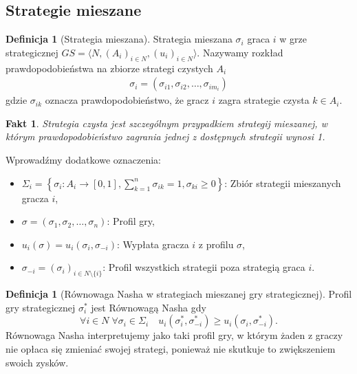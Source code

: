 \documentclass[inzynierska]{pwr_wmat_praca_dyplomowa}
\theoremstyle{plain}
\numberwithin{theorem}{chapter}
\newtheorem{fact}[theorem]{Fakt}
\theoremstyle{definition}
\numberwithin{theorem}{chapter}
\newtheorem{definition}[theorem]{Definicja}
\begin{document}
	\subsection{Strategie mieszane}
	\begin{definition}[Strategia mieszana]
		Strategia mieszana $\sigma_i$ graca $i$ w grze strategicznej $GS = \langle N, (A_i)_{i \in N}, (u_i)_{i \in N} \rangle $. Nazywamy rozkład prawdopodobieństwa na zbiorze strategi czystych $A_i$
		\begin{align*}
			\sigma_i = (\sigma_{i1},  \sigma_{i2}, \dots, \sigma_{im_i})
		\end{align*}
	gdzie $\sigma_{ik}$ oznacza prawdopodobieństwo, że gracz $i$ zagra strategie czysta $k\in A_i$.  
	\end{definition}

	\begin{fact}
		Strategia czysta jest szczególnym przypadkiem strategij mieszanej, w którym prawdopodobieństwo zagrania jednej z dostępnych strategii wynosi 1.
	\end{fact}
	Wprowadźmy dodatkowe oznaczenia:
 	\begin{itemize}
 		\item $\Sigma_i  = \left\{ \sigma_i: A_i \rightarrow [0, 1], \sum_{k=1}^{n} \sigma_{ik} = 1,  \sigma_{ki}\ge 0 \right\}$: Zbiór strategii mieszanych gracza $i$,
 		\item  $\sigma = (\sigma_1, \sigma_2, \dots, \sigma_n)$: Profil gry,
 		\item $u_i(\sigma) = u_i(\sigma_i, \sigma_{-i})$: Wypłata gracza $i$ z profilu $\sigma$,
 		\item $\sigma_{-i} = (\sigma_i)_{i\in N \setminus \{i\}}$: Profil wszystkich strategii poza strategią graca $i$. 
 	\end{itemize}
	\begin{definition}[Równowaga Nasha w strategiach mieszanej gry strategicznej]
		Profil gry strategicznej $\sigma_i^*$ jest Równowagą Nasha gdy
		\begin{equation*}
			\mathop{\forall}{i \in N}\;
			\mathop{\forall}{\sigma_i \in \Sigma_i} \quad
			u_i(\sigma_i^*, \sigma_{-i}^*) \ge u_i(\sigma_i,  \sigma_{-i}^*).
		\end{equation*}
	Równowaga Nasha interpretujemy jako taki profil gry, w którym żaden z graczy nie opłaca się zmieniać swojej strategi, ponieważ nie skutkuje to zwiększeniem swoich zysków.
	\end{definition}
\end{document}
